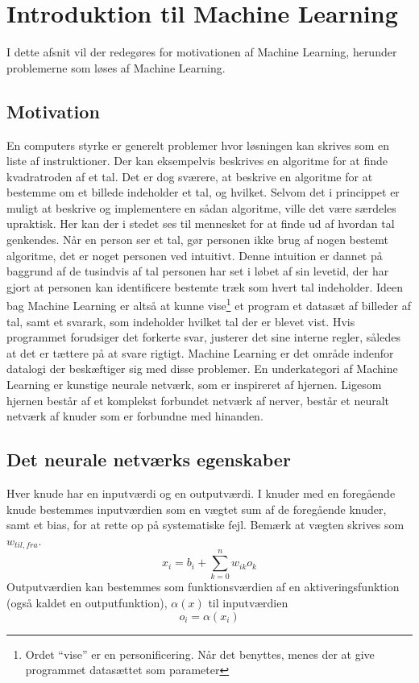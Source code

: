 \documentclass[../SOP.tex]{subfiles}
\begin{document}
\section{Introduktion til Machine Learning}
I dette afsnit vil der redegøres for motivationen af Machine Learning, herunder problemerne som løses af Machine Learning. 

\subsection{Motivation}
En computers styrke er generelt problemer hvor løsningen kan skrives som en liste af instruktioner. Der kan eksempelvis beskrives en algoritme for at finde kvadratroden af et tal. Det er dog sværere, at beskrive en algoritme for at bestemme om et billede indeholder et tal, og hvilket.
Selvom det i princippet er muligt at beskrive og implementere en sådan algoritme, ville det være særdeles upraktisk. Her kan der i stedet ses til mennesket for at finde ud af hvordan tal genkendes. Når en person ser et tal, gør personen ikke brug af nogen bestemt algoritme, det er noget personen ved intuitivt. Denne intuition er dannet på baggrund af de tusindvis af tal personen har set i løbet af sin levetid, der har gjort at personen kan identificere bestemte træk som hvert tal indeholder. Ideen bag Machine Learning er altså at kunne vise\footnote{Ordet ``vise'' er en personificering. Når det benyttes, menes der at give programmet datasættet som parameter} et program et datasæt af billeder af tal, samt et svarark, som indeholder hvilket tal der er blevet vist. Hvis programmet forudsiger det forkerte svar, justerer det sine interne regler, således at det er tættere på at svare rigtigt. Machine Learning er det område indenfor datalogi der beskæftiger sig med disse problemer. En underkategori af Machine Learning er kunstige neurale netværk, som er inspireret af hjernen. Ligesom hjernen består af et komplekst forbundet netværk af nerver, består et neuralt netværk af knuder som er forbundne med hinanden. \parencite{mitch}
\subsection{Det neurale netværks egenskaber}
Hver knude har en inputværdi og en outputværdi. I knuder med en foregående knude bestemmes inputværdien som en vægtet sum af de foregående knuder, samt et bias, for at rette op på systematiske fejl. Bemærk at vægten skrives som $w_{til,fra}$.
\begin{equation}
  x_i=b_i+\sum_{k=0}^{n} w_{ik}o_k
  \label{eq:inputvalue}
\end{equation}
Outputværdien kan bestemmes som funktionsværdien af en aktiveringsfunktion (også kaldet en outputfunktion), $\alpha(x)$ til inputværdien
\begin{equation}
  o_i=\alpha(x_i)
  \label{eq:outputvalue}
\end{equation}
\end{document}
